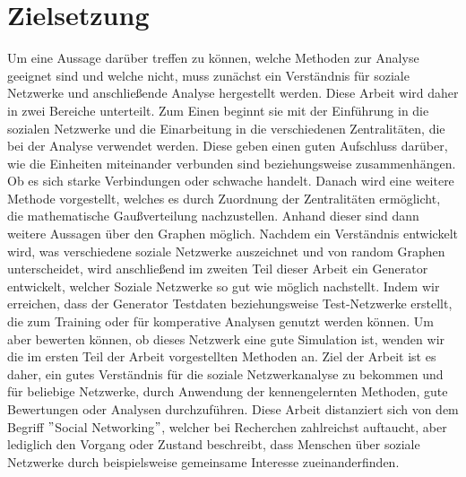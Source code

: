 \section{Zielsetzung}\label{sec:zielsetzung}
Um eine Aussage darüber treffen zu können, welche Methoden zur Analyse geeignet sind und welche nicht, muss zunächst ein Verständnis für soziale Netzwerke und anschließende Analyse hergestellt werden. Diese Arbeit wird daher in zwei Bereiche unterteilt. Zum Einen beginnt sie mit der Einführung in die sozialen Netzwerke und die Einarbeitung in die verschiedenen Zentralitäten, die bei der Analyse verwendet werden. Diese geben einen guten Aufschluss darüber, wie die Einheiten miteinander verbunden sind beziehungsweise zusammenhängen. Ob es sich starke Verbindungen oder schwache handelt. Danach wird eine weitere Methode vorgestellt, welches es durch Zuordnung der Zentralitäten ermöglicht, die mathematische Gaußverteilung nachzustellen. Anhand dieser sind dann weitere Aussagen über den Graphen möglich. Nachdem ein Verständnis entwickelt wird, was verschiedene soziale Netzwerke auszeichnet und von random Graphen unterscheidet, wird anschließend im zweiten Teil dieser Arbeit ein Generator entwickelt, welcher Soziale Netzwerke so gut wie möglich nachstellt. Indem wir erreichen, dass der Generator Testdaten beziehungsweise Test-Netzwerke erstellt, die zum Training oder für komperative Analysen genutzt werden können. Um aber bewerten können, ob dieses Netzwerk eine gute Simulation ist, wenden wir die im ersten Teil der Arbeit vorgestellten Methoden an. Ziel der Arbeit ist es daher, ein gutes Verständnis für die soziale Netzwerkanalyse zu bekommen und für beliebige Netzwerke, durch Anwendung der kennengelernten Methoden, gute Bewertungen oder Analysen durchzuführen.
Diese Arbeit distanziert sich von dem Begriff $"$Social Networking$"$, welcher bei Recherchen zahlreichst auftaucht, aber lediglich den Vorgang oder Zustand beschreibt, dass Menschen über soziale Netzwerke durch beispielsweise gemeinsame Interesse zueinanderfinden. 




